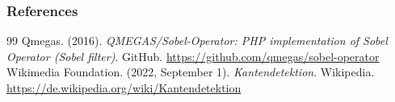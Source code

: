 \documentclass[11pt,compress,t,notes=noshow, xcolor=table]{beamer}
\begin{document}
\begin{vbframe}
\frametitle{References}
\footnotesize{
\begin{thebibliography}{99}
 Qmegas. (2016). \textit{QMEGAS/Sobel-Operator: PHP implementation of Sobel Operator (Sobel filter)}. GitHub. \url{https://github.com/qmegas/sobel-operator} 
 Wikimedia Foundation. (2022, September 1). \textit{Kantendetektion}. Wikipedia. \url{https://de.wikipedia.org/wiki/Kantendetektion} 
\end{thebibliography}
}
\end{vbframe}

\endlecture
\end{document}
